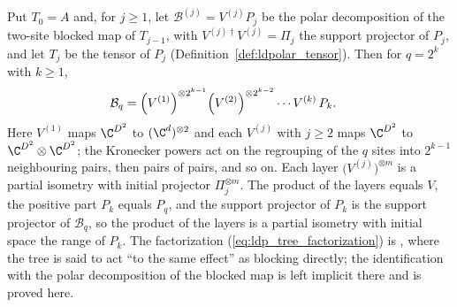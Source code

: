 \begin{lemma}
    \label{thm:ldp_tree_factorization}
    \leanok
    Put $T_0=A$ and, for $j\ge1$, let $\mathcal B^{(j)}=V^{(j)}P_j$ be the polar
    decomposition of the two-site blocked map of $T_{j-1}$, with
    $V^{(j)\dagger}V^{(j)}=\Pi_j$ the support projector of $P_j$, and let $T_j$
    be the tensor of $P_j$ (Definition~\ref{def:ldpolar_tensor}). Then for
    $q=2^k$ with $k\ge1$,
    \begin{align}
        \mathcal B_q
         & =\Bigl(V^{(1)}\Bigr)^{\otimes2^{k-1}}
        \Bigl(V^{(2)}\Bigr)^{\otimes2^{k-2}}\cdots V^{(k)}\,P_k.
        \label{eq:ldp_tree_factorization}
    \end{align}
    Here $V^{(1)}$ maps $\C^{D^2}$ to $(\C^d)^{\otimes2}$ and each $V^{(j)}$ with
    $j\ge2$ maps $\C^{D^2}$ to $\C^{D^2}\otimes\C^{D^2}$; the Kronecker powers
    act on the regrouping of the $q$ sites into $2^{k-1}$ neighbouring pairs,
    then pairs of pairs, and so on. Each layer
    $\bigl(V^{(j)}\bigr)^{\otimes m}$ is a partial isometry with initial
    projector $\Pi_j^{\otimes m}$. The product of the layers equals $V$, the
    positive part $P_k$ equals $P_q$, and the support projector of $P_k$ is the
    support projector of $\mathcal B_q$, so the product of the layers is a
    partial isometry with initial space the range of $P_k$. The
    factorization (\ref{eq:ldp_tree_factorization}) is
    \cite[eq.~(16)]{Malz2024Preparation}, where the tree is said to act ``to the
    same effect'' as blocking directly; the identification with the polar
    decomposition of the blocked map is left implicit there and is proved
    here.
\end{lemma}

